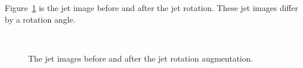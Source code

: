 \documentclass[12pt]{article}
\begin{document}
		Figure~\ref{fig:jet_rotation_jet_constituent_jet_image} is the jet image before and after the jet rotation. These jet images differ by a rotation angle.
		\begin{figure}[htpb]
			\centering
			 \\
			\caption{The jet images before and after the jet rotation augmentation.}
			\label{fig:jet_rotation_jet_constituent_jet_image}
		\end{figure}
\end{document}
